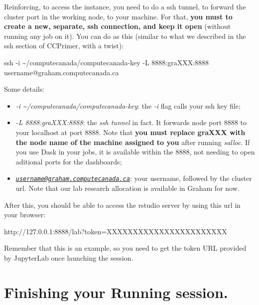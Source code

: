 \documentclass[
]{book}
\newenvironment{Shaded}{\begin{snugshade}}{\end{snugshade}}
\newcommand{\AttributeTok}[1]{\textcolor[rgb]{0.77,0.63,0.00}{#1}}
\newcommand{\ExtensionTok}[1]{#1}
\newcommand{\FunctionTok}[1]{\textcolor[rgb]{0.00,0.00,0.00}{#1}}
\newcommand{\NormalTok}[1]{#1}
\providecommand{\tightlist}{%
  \setlength{\itemsep}{0pt}\setlength{\parskip}{0pt}}
\begin{document}
Reinforcing, to access the instance, you need
to do a ssh tunnel, to forward the cluster port in the working node, to your machine. For that, \textbf{you must to create a new, separate, ssh connection, and keep it open} (without
running any job on it). You can do as this (similar to what we described in the ssh section of CCPrimer, with a twist):

\begin{Shaded}
\begin{Highlighting}[]
\FunctionTok{ssh} \AttributeTok{{-}i}\NormalTok{ \textasciitilde{}/computecanada/computecanada{-}key }\AttributeTok{{-}L}\NormalTok{ 8888:graXXX:8888 username@graham.computecanada.ca}
\end{Highlighting}
\end{Shaded}

Some details:

\begin{itemize}
\tightlist
\item
  \emph{-i \textasciitilde/computecanada/computecanada-key}: the \emph{-i} flag calls your ssh key file;
\item
  \emph{-L 8888:graXXX:8888}: the \emph{ssh tunnel} in fact. It forwards node port 8888 to your localhost at port 8888. Note that \textbf{you must replace graXXX with the node name of the machine assigned to you} after running \emph{salloc}. If you use Dask in your jobs, it is available within the 8888, not needing to open aditional ports for the dashboards;
\item
  \emph{\href{mailto:username@graham.computecanada.ca}{\nolinkurl{username@graham.computecanada.ca}}}: your username, followed by the cluster url. Note that our lab research allocation is available in Graham for now.
\end{itemize}

After this, you should be able to access the rstudio server by using this url
in your browser:

\begin{Shaded}
\begin{Highlighting}[]
\ExtensionTok{http://127.0.0.1:8888/lab?token=XXXXXXXXXXXXXXXXXXXXXXX}
\end{Highlighting}
\end{Shaded}

Remember that this is an example, so you need to get the token URL provided by JupyterLab once launching the session.

\hypertarget{finishing-your-running-session.-1}{%
\section{Finishing your Running session.}\label{finishing-your-running-session.-1}}
\end{document}
